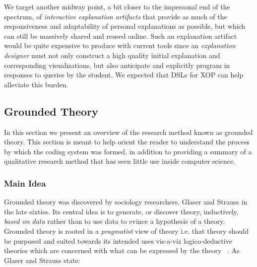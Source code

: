 \documentclass[sigconf]{acmart}
\begin{document}
We target another midway point, a bit closer to the impersonal end of the
spectrum, of \emph{interactive explanation artifacts} that provide as much of
the responsiveness and adaptability of personal explanations as possible, but
which can still be massively shared and reused online. Such an explanation
artifact would be quite expensive to produce with current tools since an
\emph{explanation designer} must not only construct a high quality initial
explanation and corresponding visualizations, but also anticipate and
explicitly program in responses to queries by the student.
%
We expected that DSLs for XOP can help alleviate this burden.





\subsection{Grounded Theory}
\label{sec:back:gt}
In this section we present an overview of the research method known as grounded
theory. This section is meant to help orient the reader to understand the
process by which the coding system was formed, in addition to providing a
summary of a qualitative research method that has seen little use inside
computer science.

\subsubsection{Main Idea}
Grounded theory was discovered by sociology researchers, Glaser and Strauss in
the late sixties. Its central idea is to generate, or discover theory,
inductively, \emph{based on data} rather than to use data to evince a hypothesis
of a theory. Grounded theory is rooted in a \emph{pragmatist} view of theory
i.e. that theory should be purposed and suited towards its intended uses
vis-a-viz logico-deductive theories which are concerned with what can be
expressed by the theory ~\cite{Strauss67discoveryof}. As Glaser and Strauss
state: 
\end{document}
